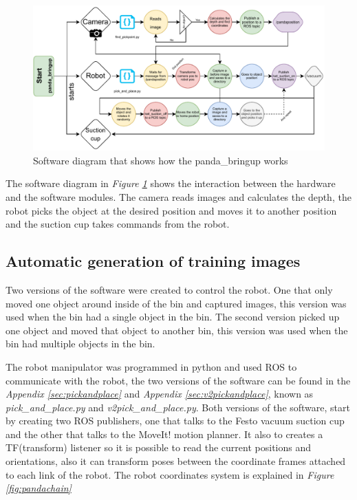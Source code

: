 \begin{figure}[h]
 \centering
 \includegraphics[width=1\textwidth]{graphics/softwareDiagram.pdf}
 \caption{Software diagram that shows how the panda\_bringup works}
 \label{fig:softwarediagram}
\end{figure}
The software diagram in \textit{Figure \ref{fig:softwarediagram}} shows the interaction between the hardware and the software modules. The camera reads images and calculates the depth, the robot picks the object at the desired position and moves it to another position and the suction cup takes commands from the robot.

\subsection{Automatic generation of training images}\label{sec:robot}
Two versions of the software were created to control the robot. One that only moved one object around inside of the bin and captured images, this version was used when the bin had a single object in the bin. The second version picked up one object and moved that object to another bin, this version was used when the bin had multiple objects in the bin.

The robot manipulator was programmed in python and used ROS to communicate with the robot, the two versions of the software can be found in the \textit{Appendix \ref{sec:pickandplace}} and \textit{Appendix \ref{sec:v2pickandplace}}, known as \textit{pick\_and\_place.py} and \textit{v2pick\_and\_place.py}. 
Both versions of the software, start by creating two ROS publishers, one that talks to the Festo vacuum suction cup and the other that talks to the MoveIt! motion planner. 
It also to creates a TF(transform) listener so it is possible to read the current positions and orientations, also it can transform poses between the coordinate frames attached to each link of the robot. The robot coordinates system is explained in \textit{Figure \ref{fig:pandachain}} 

